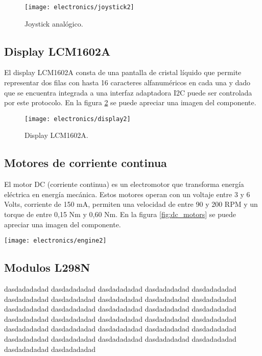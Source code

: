 \begin{figure}[h]
    \centering
    \texttt{[image: electronics/joystick2]}
    \caption{Joystick analógico.}
    \label{fig:joystick}
\end{figure}


\subsection{Display LCM1602A}
El display LCM1602A \cite{LCM1602A_datasheet} consta de una pantalla de cristal líquido que permite representar dos filas con hasta 16 caracteres alfanuméricos en cada una y dado que se encuentra integrada a una interfaz adaptadora I2C puede ser controlada por este protocolo. En la figura \ref{fig:display} se puede apreciar una imagen del componente.

\begin{figure}[h]
    \centering
    \texttt{[image: electronics/display2]}
    \caption{Display LCM1602A.}
    \label{fig:display}
\end{figure}

\subsection{Motores de corriente continua}
El motor DC (corriente continua) \cite{dc_motor_datasheet} es un electromotor que transforma energía eléctrica en energía mecánica. Estos motores operan con un voltaje entre 3 y 6 Volts, corriente de 150 mA, permiten una velocidad de entre 90 y 200 RPM y un torque de entre 0,15 Nm y 0,60 Nm. En la figura \ref{fig:dc_motors} se puede apreciar una imagen del componente.


\begin{center}
  \texttt{[image: electronics/engine2]}
    \label{fig:dc_motors}
\end{center}
  


\subsection{Modulos L298N}
dasdadadadad dasdadadadad dasdadadadad dasdadadadad dasdadadadad dasdadadadad dasdadadadad dasdadadadad dasdadadadad dasdadadadad dasdadadadad dasdadadadad dasdadadadad dasdadadadad dasdadadadad dasdadadadad dasdadadadad dasdadadadad dasdadadadad dasdadadadad dasdadadadad dasdadadadad dasdadadadad dasdadadadad dasdadadadad dasdadadadad dasdadadadad dasdadadadad dasdadadadad dasdadadadad dasdadadadad dasdadadadad

